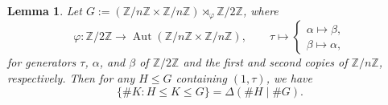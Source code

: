 \documentclass[table,dvipsnames]{amsart}
\newcommand{\Aut}{\operatorname{Aut}}
\newcommand{\Z}{\mathbb{Z}}
\newtheorem{lemma}[theorem]{Lemma}
\numberwithin{equation}{section}
\begin{document}
\begin{lemma}
\label{lem:nssubgpordallmult}
Let $G:=(\Z/n\Z\times\Z/n\Z)\rtimes_\varphi\Z/2\Z$, where
\begin{equation*}
\varphi\colon\Z/2\Z\to\Aut(\Z/n\Z\times\Z/n\Z),\qquad\tau\mapsto\begin{cases}
\alpha\mapsto\beta,\\
\beta\mapsto\alpha,
\end{cases}
\end{equation*}
for generators $\tau$, $\alpha$, and $\beta$ of $\Z/2\Z$ and the first and second copies of $\Z/n\Z$, respectively. Then for any $H\le G$ containing $(1,\tau)$, we have
\begin{equation*}
\{\#K:H\le K\le G\}=\Delta(\#H\mid\#G).
\end{equation*}
\end{lemma}
\end{document}
